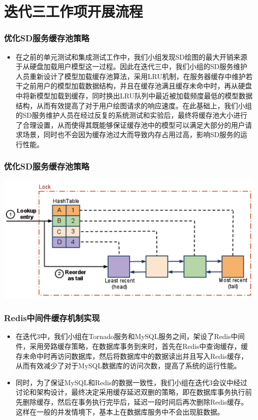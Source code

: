 \section{迭代三工作项开展流程}
\begin{frame}
    \frametitle{优化SD服务缓存池策略}
    \begin{itemize}
        \item 在之前的单元测试和集成测试工作中，我们小组发现SD绘图的最大开销来源于从硬盘加载用户模型这一过程。因此在迭代三中，我们小组的SD服务维护人员重新设计了模型加载缓存池算法，采用LRU机制，在服务器缓存中维护若干之前用户的模型加载数据结构，并且在缓存池满且缓存未命中时，再从硬盘中将新模型加载到缓存，同时换出LRU队列中最近被加载频度最低的模型数据结构，从而有效提高了对于用户绘图请求的响应速度。在此基础上，我们小组的SD服务维护人员在经过反复的系统测试和实验后，最终将缓存池大小进行了合理设置，从而使得其既能够保证缓存池中的模型可以满足大部分的用户请求场景，同时也不会因为缓存池过大而导致内存占用过高，影响SD服务的运行性能。
    \end{itemize}
\end{frame}

\begin{frame}
    \frametitle{优化SD服务缓存池策略}
    \includegraphics[width=\textwidth]{contents/figure/LRU.png}
\end{frame}

\begin{frame}
    \frametitle{Redis中间件缓存机制实现}
    \begin{itemize}
        \item 在迭代3中，我们小组在Tornado服务和MySQL服务之间，架设了Redis中间件，采用旁路缓存策略，在数据库事务到来时，首先在Redis中查询缓存，缓存未命中时再访问数据库，然后将数据库中的数据读出并且写入Redis缓存，从而有效减少了对于MySQL数据库的访问次数，提高了系统的运行性能。
        \item 同时，为了保证MySQL和Redis的数据一致性，我们小组在迭代3会议中经过讨论和架构设计，最终决定采用缓存延迟双删的策略，即在数据库事务执行前先删除缓存，然后在事务执行完毕后，延迟一段时间后再次删除Redis缓存。这样在一般的并发情境下，基本上在数据库服务中不会出现脏数据。
    \end{itemize}
\end{frame}

